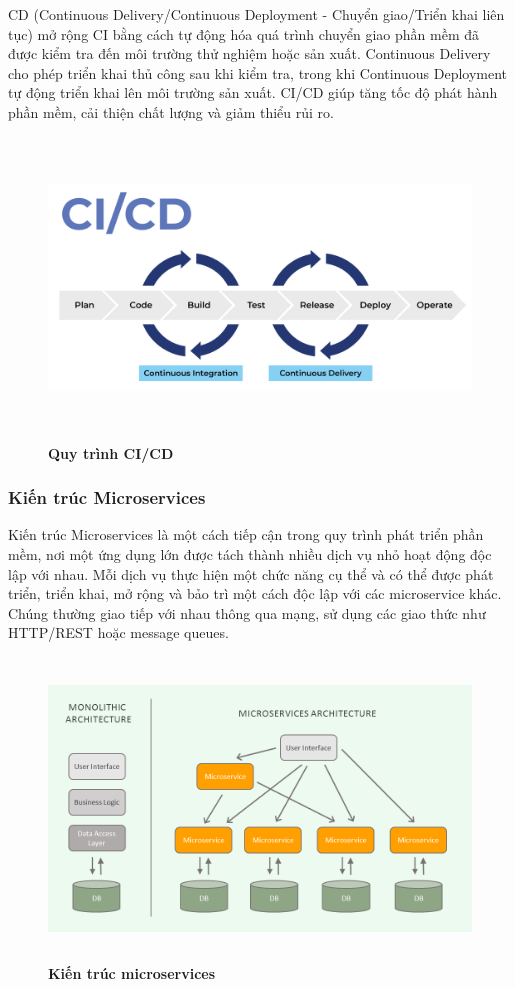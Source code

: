 CD (Continuous Delivery/Continuous Deployment - Chuyển giao/Triển khai liên tục) mở rộng CI bằng cách tự động hóa quá trình chuyển giao phần mềm đã được kiểm tra đến môi trường thử nghiệm hoặc sản xuất. Continuous Delivery cho phép triển khai thủ công sau khi kiểm tra, trong khi Continuous Deployment tự động triển khai lên môi trường sản xuất. CI/CD giúp tăng tốc độ phát hành phần mềm, cải thiện chất lượng và giảm thiểu rủi ro.
\begin{figure}[H]
	\centering
	\includegraphics[width=15cm,height=8cm]{Images/Technology/cicd.png}
	\caption[Quy trình CI/CD]{\bfseries \fontsize{12pt}{0pt}
		\selectfont Quy trình CI/CD}
	\label{cicd} %
\end{figure}

\subsubsection{Kiến trúc Microservices}
Kiến trúc Microservices là một cách tiếp cận trong quy trình phát triển phần mềm, nơi một ứng dụng lớn được tách thành nhiều dịch vụ nhỏ hoạt động độc lập với nhau.
Mỗi dịch vụ thực hiện một chức năng cụ thể và có thể được phát triển, triển khai, mở rộng và bảo trì một cách độc lập với các microservice khác. Chúng thường giao tiếp với nhau thông qua mạng, sử dụng các giao thức như HTTP/REST hoặc message queues.

\begin{figure}[H]
	\centering
	\includegraphics[width=15cm,height=8cm]{Images/Technology/microservice.png}
	\caption[Kiến trúc microservices]{\bfseries \fontsize{12pt}{0pt}
		\selectfont Kiến trúc microservices}
	\label{microservice} %
\end{figure}

